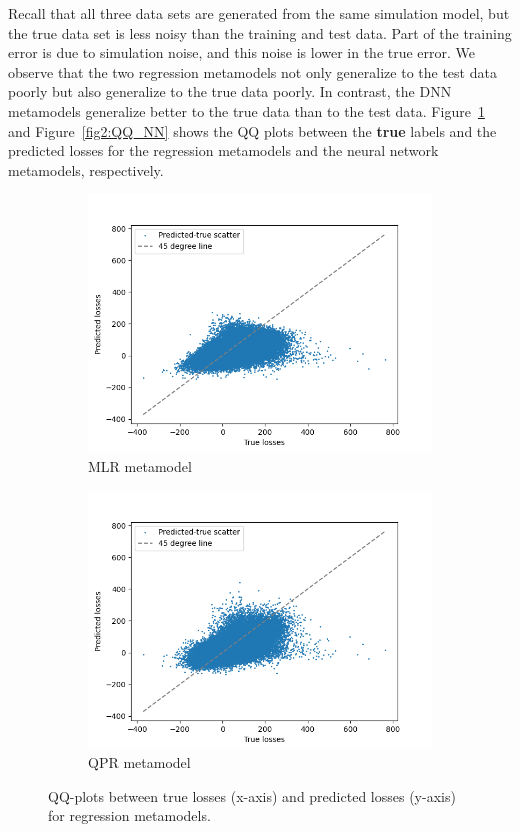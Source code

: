 Recall that all three data sets are generated from the same simulation model, but the true data set is less noisy than the training and test data.
Part of the training error is due to simulation noise, and this noise is lower in the true error.
We observe that the two regression metamodels not only generalize to the test data poorly but also generalize to the true data poorly.
In contrast, the DNN metamodels generalize better to the true data than to the test data.
Figure~\ref{fig2:QQ_REG} and Figure~\ref{fig2:QQ_NN} shows the QQ plots between the \textbf{true} labels and the predicted losses for the regression metamodels and the neural network metamodels, respectively.

\begin{figure}[ht!]
    \centering
    \begin{subfigure}{0.48\textwidth}
        \includegraphics[width=\textwidth]{./project2/figures/qqPlots/mlrLN.png}
        \caption{MLR metamodel}
    \end{subfigure}\hfill
    \begin{subfigure}{0.48\textwidth}
        \includegraphics[width=\textwidth]{./project2/figures/qqPlots/qprLN.png}
        \caption{QPR metamodel}
    \end{subfigure}
    \caption{QQ-plots between true losses (x-axis) and predicted losses (y-axis) for regression metamodels.} 
    \label{fig2:QQ_REG}
\end{figure}

